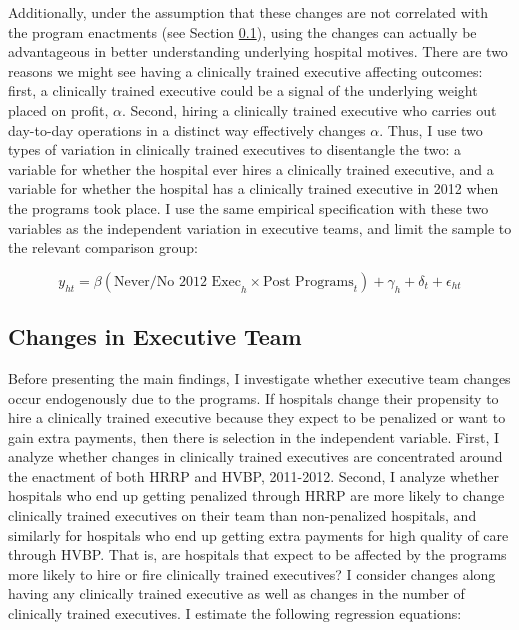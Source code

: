 \documentclass[12pt]{article}
\begin{document}
    Additionally, under the assumption that these changes are not correlated with the program enactments (see Section \ref{sec:endog}), using the changes can actually be advantageous in better understanding underlying hospital motives. There are two reasons we might see having a clinically trained executive affecting outcomes: first, a clinically trained executive could be a signal of the underlying weight placed on profit, $\alpha$. Second, hiring a clinically trained executive who carries out day-to-day operations in a distinct way effectively changes $\alpha$. Thus, I use two types of variation in clinically trained executives to disentangle the two: a variable for whether the hospital ever hires a clinically trained executive, and a variable for whether the hospital has a clinically trained executive in 2012 when the programs took place. I use the same empirical specification with these two variables as the independent variation in executive teams, and limit the sample to the relevant comparison group: 

    \begin{equation}
    \label{eq:decomp}
    y_{ht} = \beta (\text{Never/No 2012 Exec}_h \times \text{Post Programs}_t) + \gamma_{h} + \delta_t + \epsilon_{ht}
    \end{equation}

    \subsection{Changes in Executive Team}\label{sec:endog}

    Before presenting the main findings, I investigate whether executive team changes occur endogenously due to the programs. If hospitals change their propensity to hire a clinically trained executive because they expect to be penalized or want to gain extra payments, then there is selection in the independent variable. First, I analyze whether changes in clinically trained executives are concentrated around the enactment of both HRRP and HVBP, 2011-2012. Second, I analyze whether hospitals who end up getting penalized through HRRP are more likely to change clinically trained executives on their team than non-penalized hospitals, and similarly for hospitals who end up getting extra payments for high quality of care through HVBP. That is, are hospitals that expect to be affected by the programs more likely to hire or fire clinically trained executives? I consider changes along having any clinically trained executive as well as changes in the number of clinically trained executives. I estimate the following regression equations:
\end{document}

